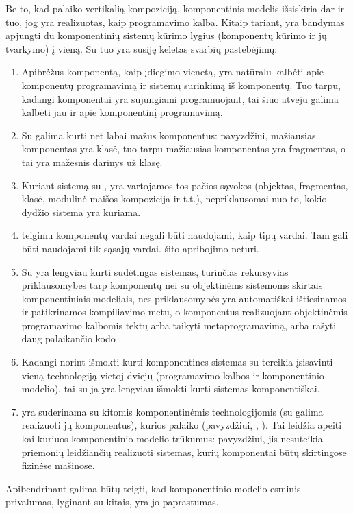 Be to, kad palaiko vertikalią kompoziciją, 
komponentinis modelis išsiskiria dar ir tuo, jog yra realizuotas, kaip
programavimo kalba. Kitaip tariant,  yra bandymas
apjungti du komponentinių sistemų kūrimo lygius (komponentų kūrimo
ir jų tvarkymo) į vieną. Su tuo yra susiję keletas svarbių pastebėjimų:
\begin{enumerate}
  \item Apibrėžus komponentą, kaip įdiegimo vienetą, yra natūralu
    kalbėti apie komponentų programavimą ir sistemų surinkimą iš
    komponentų. Tuo tarpu, kadangi  komponentai yra
    sujungiami programuojant, tai šiuo atveju galima kalbėti jau ir
    apie komponentinį programavimą.
  \item Su  galima kurti net labai mažus komponentus:
    pavyzdžiui,  mažiausias komponentas yra
     klasė, tuo tarpu  mažiausias
    komponentas yra fragmentas, o tai yra mažesnis darinys už klasę.
  \item Kuriant sistemą su , yra vartojamos tos
    pačios sąvokos (objektas, fragmentas, klasė, modulinė maišos
    kompozicija ir t.t.), nepriklausomai nuo to, kokio dydžio
    sistema yra kuriama.
  \item \cite[36]{heineman2001component} teigimu komponentų vardai
    negali būti naudojami, kaip tipų vardai. Tam gali būti naudojami
    tik sąsajų vardai.  šito apribojimo neturi.
  \item Su  yra lengviau kurti sudėtingas sistemas,
    turinčias rekursyvias priklausomybes tarp komponentų nei su
    objektinėms sistemoms skirtais komponentiniais modeliais, nes
    priklausomybės yra automatiškai ištiesinamos ir patikrinamos
    kompiliavimo metu, o komponentus realizuojant objektinėmis
    programavimo kalbomis tektų arba taikyti metaprogramavimą,
    arba rašyti daug palaikančio kodo
    \cite[9]{scalable-component-abstractions}.
  \item Kadangi norint išmokti kurti komponentines sistemas su
     tereikia įsisavinti vieną technologiją
    vietoj dviejų (programavimo kalbos ir komponentinio modelio),
    tai su ja yra lengviau išmokti kurti sistemas komponentiškai.
  \item {} yra suderinama su kitomis komponentinėmis
    technologijomis (su  galima realizuoti jų
    komponentus), kurios palaiko  (pavyzdžiui,
    , ). Tai leidžia apeiti kai kuriuos
     komponentinio modelio trūkumus: pavyzdžiui,
    jis nesuteikia priemonių leidžiančių realizuoti sistemas, kurių
    komponentai būtų skirtingose fizinėse mašinose.
\end{enumerate}

Apibendrinant galima būtų teigti, kad  komponentinio
modelio esminis privalumas, lyginant su kitais, yra jo paprastumas.
